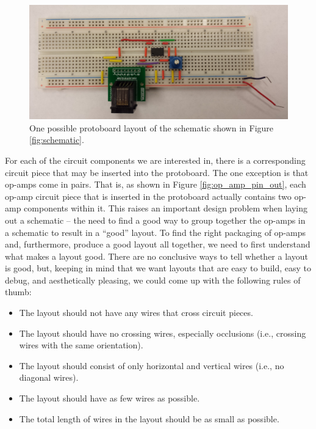 \begin{figure}
\begin{center}
\includegraphics[width=\textwidth]{Images/sample_physical_layout.jpg}
\caption[Sample protoboard layout]{One possible protoboard layout of the
schematic shown in Figure \ref{fig:schematic}.}
\label{fig:eg_s_to_pb}
\end{center}
\end{figure}

For each of the circuit components we are interested in, there is a corresponding
circuit piece that may be inserted into the protoboard. The one exception is that
op-amps come in pairs. That is, as shown in Figure \ref{fig:op_amp_pin_out},
each op-amp circuit piece that is inserted in the
protoboard actually contains two op-amp components within it. This raises an
important design problem when laying out a schematic -- the need to find a
good way to group together the op-amps in a schematic to result in a ``good''
layout. To find the right packaging of op-amps and, furthermore, produce a
good layout all together, we need to first understand what makes a layout good.
There are no conclusive ways to tell whether a layout is good, but, keeping in
mind that we want layouts that are easy to build,
easy to debug, and aesthetically pleasing, we could come up with the
following rules of thumb:
\begin{itemize}
\item The layout should not have any wires that cross circuit pieces.
\item The layout should have no crossing wires, especially occlusions (i.e.,
crossing wires with the same orientation).
\item The layout should consist of only horizontal and vertical wires (i.e., no
diagonal wires).
\item The layout should have as few wires as possible.
\item The total length of wires in the layout should be as small as possible.
\end{itemize}

